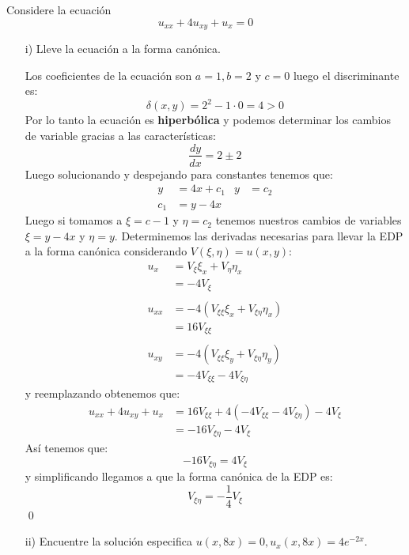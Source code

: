 \newpage

\begin{homeworkProblem}
    Considere la ecuación
    $$u_{xx}+4u_{xy}+u_x=0$$
    \begin{itemize}
        \item [i)] Lleve la ecuación a la forma canónica.
        \begin{solucion}
         Los coeficientes de la ecuación son $a=1, b=2$ y $c=0$ luego el discriminante es:
         $$\delta(x,y)=2^2-1\cdot0=4>0$$
         Por lo tanto la ecuación es \textbf{hiperbólica} y podemos determinar los cambios de variable gracias a las características:
         $$\dfrac{dy}{dx}=2\pm2$$
         Luego solucionando y despejando para constantes tenemos que:
         \begin{align*}
             y&=4x+c_1 & y&=c_2\\
             c_1&=y-4x
         \end{align*}
         Luego si tomamos a $\xi=c-1$ y $\eta=c_2$ tenemos nuestros cambios de variables $\xi=y-4x$ y $\eta=y$. Determinemos las derivadas necesarias para llevar la EDP a la forma canónica considerando $V(\xi,\eta)=u(x,y)$:
         \begin{align*}
          u_x&=V_\xi\xi_x+V_\eta\eta_x\\
          &=-4V_\xi\\
          \\
          u_{xx}&=-4(V_{\xi\xi}\xi_x+V_{\xi\eta}\eta_x)\\
          &=16V_{\xi\xi}\\
          \\
          u_{xy}&=-4(V_{\xi\xi}\xi_y+V_{\xi\eta}\eta_y)\\
          &=-4V_{\xi\xi}-4V_{\xi\eta}
         \end{align*}
         y reemplazando obtenemos que:
         \begin{align*}
          u_{xx}+4u_{xy}+u_x&=16V_{\xi\xi}+4(-4V_{\xi\xi}-4V_{\xi\eta})-4V_\xi\\
          &=-16V_{\xi\eta}-4V_\xi
         \end{align*}
         Así tenemos que:
         $$-16V_{\xi\eta}=4V_\xi$$
         y simplificando llegamos a que la forma canónica de la EDP es:
         $$V_{\xi\eta}=-\dfrac{1}{4}V_\xi$$
         \qed
        \end{solucion}
        \item [ii)] Encuentre la solución especifica $u(x,8x)=0,u_x(x,8x)=4e^{-2x}.$
        \begin{solucion}

\end{solucion}
\end{itemize}
\end{homeworkProblem}
